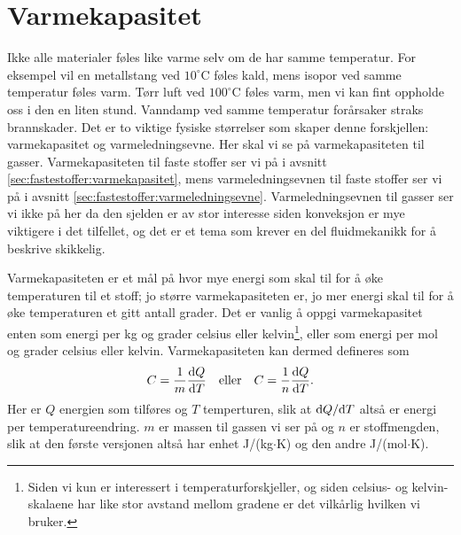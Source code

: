\section{Varmekapasitet}
Ikke alle materialer føles like varme selv om de har samme temperatur. For eksempel vil en metallstang ved $10^\circ\mathrm{C}$ føles kald, mens isopor ved samme temperatur føles varm. Tørr luft ved $100^\circ\mathrm{C}$ føles varm, men vi kan fint oppholde oss i den en liten stund. Vanndamp ved samme temperatur forårsaker straks brannskader. Det er to viktige fysiske størrelser som skaper denne forskjellen: varmekapasitet og varmeledningsevne. Her skal vi se på varmekapasiteten til gasser. Varmekapasiteten til faste stoffer ser vi på i avsnitt \ref{sec:fastestoffer:varmekapasitet}, mens varmeledningsevnen til faste stoffer ser vi på i avsnitt \ref{sec:fastestoffer:varmeledningsevne}. Varmeledningsevnen til gasser ser vi ikke på her da den sjelden er av stor interesse siden konveksjon er mye viktigere i det tilfellet, og det er et tema som krever en del fluidmekanikk for å beskrive skikkelig.

Varmekapasiteten er et mål på hvor mye energi som skal til for å øke temperaturen til et stoff; jo større varmekapasiteten er, jo mer energi skal til for å øke temperaturen et gitt antall grader. Det er vanlig å oppgi varmekapasitet enten som energi per kg og grader celsius eller kelvin\footnote{Siden vi kun er interessert i temperaturforskjeller, og siden celsius- og kelvin-skalaene har like stor avstand mellom gradene er det vilkårlig hvilken vi bruker.}, eller som energi per mol og grader celsius eller kelvin. Varmekapasiteten kan dermed defineres som 
\begin{displaymath}
	C = \frac{1}{m}\frac{\text{d} Q}{\text{d} T}\quad\text{eller}\quad
	C = \frac{1}{n}\frac{\text{d} Q}{\text{d} T}.
\end{displaymath}
Her er $Q$ energien som tilføres og $T$ temperturen, slik at $\text{d} Q/\text{d} T$ altså er energi per temperatureendring. $m$ er massen til gassen vi ser på og $n$ er stoffmengden, slik at den første versjonen altså har enhet J/(kg$\cdot$K) og den andre J/(mol$\cdot$K).

